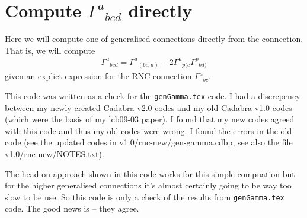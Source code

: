 \documentclass[12pt]{cdblatex}
\begin{document}
\section*{Compute $\Gamma^{a}{}_{bcd}$ directly}

Here we will compute one of generalised connections directly from the connection. That is, we will
compute
\begin{align}
   \Gamma^{a}{}_{bcd} = \Gamma^{a}{}_{(bc,d)} - 2 \Gamma^{a}{}_{p(c} \Gamma^{p}{}_{bd)}
\end{align}
given an explict expression for the RNC connection $\Gamma^{a}{}_{bc}$.

This code was written as a check for the {\tt genGamma.tex} code. I had a discrepency between my
newly created Cadabra v2.0 codes and my old Cadabra v1.0 codes (which were the basis of my lcb09-03 paper).
I found that my new codes agreed with this code and thus my old codes were wrong. I found the errors
in the old code (see the updated codes in v1.0/rnc-new/gen-gamma.cdbp, see also the file v1.0/rnc-new/NOTES.txt).

The head-on approach shown in this code works for this simple compuation but for the higher
generalised connections it's almost certainly going to be way too slow to be use. So this code is
only a check of the results from {\tt genGamma.tex} code. The good news is -- they agree.

\clearpage
\end{document}
